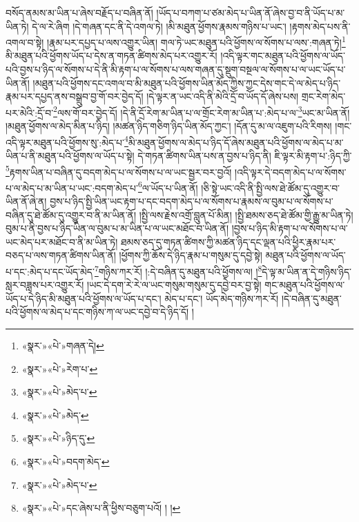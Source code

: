 བསོད་ནམས་མ་ཡིན་པ་ཞེས་བརྗོད་པ་བཞིན་ནོ། །ཡོད་པ་བཀག་པ་ཙམ་མེད་པ་ཡིན་ནོ་ཞེས་བྱ་བ་ནི་ཡོད་པ་མ་ཡིན་ཏེ། དེ་ལ་རེ་ཞིག །དེ་གཞན་དང་ནི་དེ་འགལ་ཏེ། །མི་མཐུན་ཕྱོགས་རྣམས་གཉིས་པ་ཡང་། །རྟགས་མེད་པས་ནི་འགལ་བ་སྟེ། །རྣམ་པར་དཔྱད་པ་ལས་འགྱུར་ཡིན། གལ་ཏེ་ཡང་མཐུན་པའི་ཕྱོགས་ལ་སོགས་པ་ལས་:གཞན་ཏེ།\footnote{«སྣར་»«པེ་»གཞན་དེ།} མི་མཐུན་པའི་ཕྱོགས་ཡོད་པ་དེས་ན་གཏན་ཚིགས་མེད་པར་འགྱུར་རོ། །འདི་ལྟར་གང་མཐུན་པའི་ཕྱོགས་ལ་ཡོད་པའི་བྱས་པ་ཉིད་ལ་སོགས་པ་དེ་ནི་མི་རྟག་པ་ལ་སོགས་པ་ལས་གཞན་དུ་སྡུག་བསྔལ་ལ་སོགས་པ་ལ་ཡང་ཡོད་པ་ཡིན་ནོ། །མཐུན་པའི་ཕྱོགས་དང་འགལ་བ་མི་མཐུན་པའི་ཕྱོགས་ཡིན་མོད་ཀྱིས་ཀྱང་དེས་གང་དེ་ལ་མེད་པ་ཉིད་རྣམ་པར་དཔྱད་ནས་བསྒྲུབ་བྱ་གོ་བར་བྱེད་དོ། །དེ་ལྟར་ན་ཡང་འདི་ནི་མེའི་དྲོ་བ་ཡོད་དོ་ཞེས་པས། གྲང་རེག་མེད་པར་མེའི་:དྲོ་བ་\footnote{«སྣར་»«པེ་»རེག་པ་}ལས་གོ་བར་བྱེད་དོ། །དེ་ནི་དྲོ་རེག་མ་ཡིན་པ་ལ་གྲོང་རེག་མ་ཡིན་པ་:མེད་པ་ལ་\footnote{«སྣར་»«པེ་»མེད་པ་}ཡང་མ་ཡིན་ནོ། །མཐུན་ཕྱོགས་ལ་མེད་མིན་པ་ཉིད། །མཚན་ཉིད་གཅིག་ཉིད་ཡིན་མོད་ཀྱང་། །དོན་དུ་མ་ལ་འཇུག་པའི་རིགས། །གང་འདི་ལྟར་མཐུན་པའི་ཕྱོགས་སུ་:མེད་པ་\footnote{«སྣར་»«པེ་»མེད་}མི་མཐུན་ཕྱོགས་ལ་མེད་པ་ཉིད་དོ་ཞེས་མཐུན་པའི་ཕྱོགས་ལ་མེད་པ་མ་ཡིན་པ་ནི་མཐུན་པའི་ཕྱོགས་ལ་ཡོད་པ་སྟེ། དེ་གཏན་ཚིགས་ཡིན་པས་ན་བྱས་པ་ཉིད་ནི། ཇི་ལྟར་མི་རྟག་པ་:ཉིད་ཀྱི་\footnote{«སྣར་»«པེ་»ཉིད་དུ་}རྟགས་ཡིན་པ་བཞིན་དུ་བདག་མེད་པ་ལ་སོགས་པ་ལ་ཡང་སྦྱར་བར་བྱའོ། །འདི་ལྟར་དེ་བདག་མེད་པ་ལ་སོགས་པ་ལ་མེད་པ་མ་ཡིན་པ་ཡང་:བདག་མེད་པ་\footnote{«སྣར་»«པེ་»བདག་མེད་}ལ་ཡོད་པ་ཡིན་ནོ། །ཅི་སྟེ་ཡང་འདི་ནི་སྤྱི་ལས་ཐེ་ཚོམ་དུ་འགྱུར་བ་ཡིན་ནོ་ཞེ་ན། བྱས་པ་ཉིད་སྤྱི་ཡིན་ཡང་རྟག་པ་དང་བདག་མེད་པ་ལ་སོགས་པ་རྣམས་ལ་བུམ་པ་ལ་སོགས་པ་བཞིན་དུ་ཐེ་ཚོམ་དུ་འགྱུར་བ་ནི་མ་ཡིན་ནོ། །སྤྱི་ལས་རྗེས་འགྲོ་བླུན་པོ་མིན། །སྤྱི་ཐམས་ཅད་ཐེ་ཚོམ་གྱི་རྒྱུ་མ་ཡིན་ཏེ། བུམ་པ་ནི་བྱས་པ་ཉིད་ཡིན་ལ་བུམ་པ་མ་ཡིན་པ་ལ་ཡང་མཐོང་བ་ཡིན་ནོ། །བྱས་པ་ཉིད་མི་རྟག་པ་ལ་སོགས་པ་ལ་ཡང་མེད་པར་མཐོང་བ་ནི་མ་ཡིན་ཏེ། ཐམས་ཅད་དུ་གཏན་ཚིགས་ཀྱི་མཚན་ཉིད་དང་ལྡན་པའི་ཕྱིར་རྣམ་པར་བཅད་པ་ལས་གཏན་ཚིགས་ཡིན་ནོ། །ཕྱོགས་ཀྱི་ཆོས་དེ་ཉིད་རྣམ་པ་གསུམ་དུ་དབྱེ་སྟེ། མཐུན་པའི་ཕྱོགས་ལ་ཡོད་པ་དང་:མེད་པ་དང་ཡོད་མེད་\footnote{«སྣར་»«པེ་»མེད་པ་}གཉིས་ཀར་རོ། །:དེ་བཞིན་དུ་མཐུན་པའི་ཕྱོགས་ལ། །\footnote{«སྣར་»«པེ་»དང་ཞེས་པ་ནི་ཕྱིས་བཅུག་པའོ། ། །}དེ་ལྟ་མ་ཡིན་ན་དེ་གཉིས་ཉིད་སླར་བཟླས་པར་འགྱུར་རོ། །ཡང་དེ་དག་རེ་རེ་ལ་ཡང་གསུམ་གསུམ་དུ་དབྱེ་བར་བྱ་སྟེ། གང་མཐུན་པའི་ཕྱོགས་ལ་ཡོད་པ་དེ་ཉིད་མི་མཐུན་པའི་ཕྱོགས་ལ་ཡོད་པ་དང་། མེད་པ་དང་། ཡོད་མེད་གཉིས་ཀར་རོ། །དེ་བཞིན་དུ་མཐུན་པའི་ཕྱོགས་ལ་མེད་པ་དང་གཉིས་ཀ་ལ་ཡང་དབྱེ་བ་དེ་ཉིད་དོ། །

